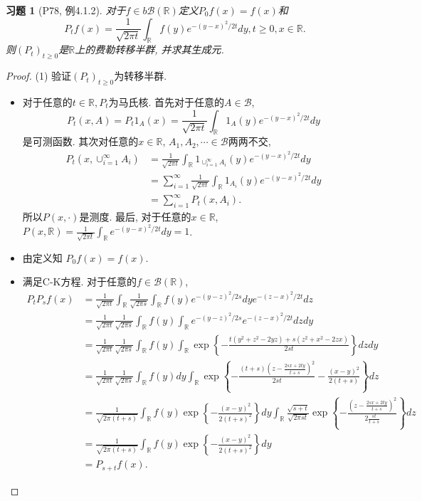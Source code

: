 \documentclass[UTF8,ondside]{ctexart}
\newtheorem{exercise}{习题}[section]
\newcommand{\h}{\mathscr}
\newcommand{\kx}{\mathbb}
\numberwithin{equation}{section}
\begin{document}
	\begin{exercise}[P78, 例4.1.2]
		对于$f\in b\h B(\kx R)$定义$P_0 f(x)=f(x)$和
		\[
			P_t f(x)=\frac{1}{\sqrt{2\pi t}}\int_{\kx R} f(y)e^{-(y-x)^2/2t}dy, t\geq 0,x\in\kx R.
		\]
		则$(P_t)_{t\geq 0}$是$\kx R$上的费勒转移半群, 并求其生成元. 
	\end{exercise}
	\begin{proof}
		(1) 验证$(P_t)_{t\geq 0}$为转移半群. 
		\begin{itemize}
			\item 对于任意的$t\in\kx R,P_t$为马氏核. 首先对于任意的$A\in\h B$,
			\[
				P_t(x,A)=P_t 1_A(x) = \frac{1}{\sqrt{2\pi t}}\int_{\kx R} 1_A (y) e^{-(y-x)^2/2t}dy
			\]
			是可测函数. 其次对任意的$x\in\kx R$, $A_1,A_2,\cdots\in\h B$两两不交,
			\[\begin{aligned}
				P_t(x,\cup_{i=1}^\infty A_i)& =\frac{1}{\sqrt{2\pi t}}\int_{\kx R} 1_{\cup_{i=1}^\infty A_i}(y) e^{-(y-x)^2/2t}dy\\
				&=\sum_{i=1}^\infty \frac{1}{\sqrt{2\pi t}}\int_{\kx R} 1_{A_i}(y) e^{-(y-x)^2/2t}dy\\
				&= \sum_{i=1}^\infty P_t(x,A_i).
			\end{aligned}
			\]
			所以$P(x,\cdot)$是测度. 最后, 对于任意的$x\in\kx R$, $P(x,\kx R)=\frac{1}{\sqrt{2\pi t}}\int_{\kx R} e^{-(y-x)^2/2t}dy=1$.
			\item 由定义知 $P_0 f(x)=f(x)$.
			\item 满足C-K方程. 对于任意的$f\in\h B(\kx R)$,
			\[
			\begin{aligned}
				P_t P_s f(x) &= \frac{1}{\sqrt{2\pi t}}\int_{\kx R} \frac{1}{\sqrt{2\pi s}}\int_{\kx R} f(y) e^{-(y-z)^2/2s} dy e^{-(z-x)^2/2t} dz\\
				&= \frac{1}{\sqrt{2\pi t}}\frac{1}{\sqrt{2\pi s}}\int_{\kx R} f(y)\int_{\kx R}e^{-(y-z)^2/2s}e^{-(z-x)^2/2t} dzdy\\
				&= \frac{1}{\sqrt{2\pi t}}\frac{1}{\sqrt{2\pi s}}\int_{\kx R} f(y)\int_{\kx R}
				\exp\left\{-\frac{t(y^2+z^2-2yz)+s(z^2+x^2-2zx)}{2st}\right\} dzdy\\
				&= \frac{1}{\sqrt{2\pi t}}\frac{1}{\sqrt{2\pi s}}\int_{\kx R} f(y) dy\int_{\kx R}
				\exp\left\{-\frac{(t+s)(z-\frac{2sx+2ty}{t+s})^2}{2st}-\frac{(x-y)^2}{2(t+s)}\right\} dz\\
				&=\frac{1}{\sqrt{2\pi(t+s)}}\int_{\kx R} f(y) \exp \left\{-\frac{(x-y)^2}{2(t+s)^2}\right\} dy\int_{\kx R} \frac{\sqrt{s+t}}{\sqrt{2\pi st}} \exp\left\{-\frac{(z-\frac{2sx+2ty}{t+s})^2}{2\frac{st}{t+s}}\right\} dz\\
				&=\frac{1}{\sqrt{2\pi(t+s)}}\int_{\kx R} f(y) \exp \left\{-\frac{(x-y)^2}{2(t+s)^2}\right\} dy\\
				&=P_{s+t}f(x).
			\end{aligned}
			\]
		\end{itemize}
		

\end{proof}
\end{document}
